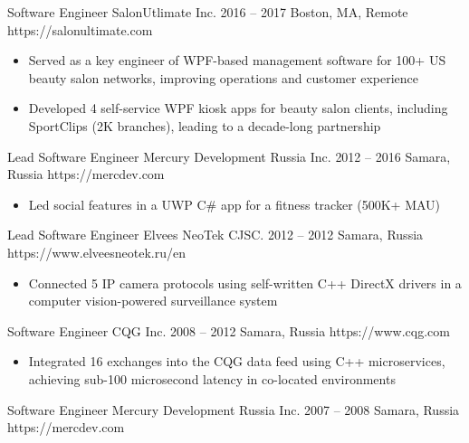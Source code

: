 \begin{paracol}{2}
    \cvLeftEvent
        {Software Engineer}
        {SalonUtlimate Inc.}
        {2016 -- 2017}
        {Boston, MA, Remote}
        {https://salonultimate.com}

        \begin{itemize}
            \item Served as a key engineer of WPF-based management software
                  for 100+ US beauty salon networks, improving operations and customer experience
            \item Developed 4 self-service WPF kiosk apps for beauty salon clients,
                  including SportClips (2K branches), leading to a decade-long partnership
        \end{itemize}

    \cvLeftEvent
        {Lead Software Engineer}
        {Mercury Development Russia Inc.}
        {2012 -- 2016}
        {Samara, Russia}
        {https://mercdev.com}

        \begin{itemize}
            \item Led social features in a UWP C\# app for a fitness tracker (500K+ MAU)
        \end{itemize}

    \cvLeftEvent
        {Lead Software Engineer}
        {Elvees NeoTek CJSC.}
        {2012 -- 2012}
        {Samara, Russia}
        {https://www.elveesneotek.ru/en}

        \begin{itemize}
            \item Connected 5 IP camera protocols using self-written C++ DirectX drivers
                  in a computer vision-powered surveillance system
        \end{itemize}

    \cvLeftEvent
        {Software Engineer}
        {CQG Inc.}
        {2008 -- 2012}
        {Samara, Russia}
        {https://www.cqg.com}

        \begin{itemize}
            \item Integrated 16 exchanges into the CQG data feed using C++ microservices,
                  achieving sub-100 microsecond latency in co-located environments
        \end{itemize}

    \cvLeftEvent
        {Software Engineer}
        {Mercury Development Russia Inc.}
        {2007 -- 2008}
        {Samara, Russia}
        {https://mercdev.com}


\end{paracol}
